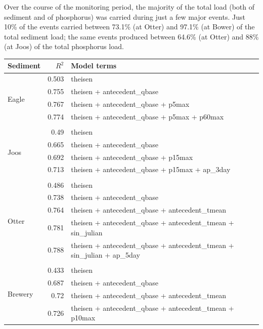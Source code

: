 \documentclass[10pt]{article}
\begin{document}
Over the course of the monitoring period, the majority of the total load (both of sediment and of phosphorus) was carried during just a few major events. Just 10\% of the events carried between 73.1\% (at Otter) and 97.1\% (at Bower) of the total sediment load; the same events produced between 64.6\% (at Otter) and 88\% (at Joos) of the total phosphorus load.\\




\begin{table}[h] \small
    \begin{center}
    \begin{tabular}{lrl}
    \textbf{Sediment} & $R^2$ & Model terms \\
    \hline
\multirow{5}{*}{Eagle} & 0.503 & theisen\\ 
 & 0.755 & theisen + antecedent\_qbase\\ 
 & 0.767 & theisen + antecedent\_qbase + p5max\\ 
 & 0.774 & theisen + antecedent\_qbase + p5max + p60max\\ 
\vspace{2mm}\\ \multirow{5}{*}{Joos} & 0.49 & theisen\\ 
 & 0.665 & theisen + antecedent\_qbase\\ 
 & 0.692 & theisen + antecedent\_qbase + p15max\\ 
 & 0.713 & theisen + antecedent\_qbase + p15max + ap\_3day\\ 
\vspace{2mm}\\ \multirow{6}{*}{Otter} & 0.486 & theisen\\ 
 & 0.738 & theisen + antecedent\_qbase\\ 
 & 0.764 & theisen + antecedent\_qbase + antecedent\_tmean\\ 
 & 0.781 & theisen + antecedent\_qbase + antecedent\_tmean + sin\_julian\\ 
 & 0.788 & theisen + antecedent\_qbase + antecedent\_tmean + sin\_julian + ap\_5day\\ 
\vspace{2mm}\\ \multirow{6}{*}{Brewery} & 0.433 & theisen\\ 
 & 0.687 & theisen + antecedent\_qbase\\ 
 & 0.72 & theisen + antecedent\_qbase + antecedent\_tmean\\ 
 & 0.726 & theisen + antecedent\_qbase + antecedent\_tmean + p10max\\ 

\end{tabular}
\end{center}
\end{table}
\end{document}
